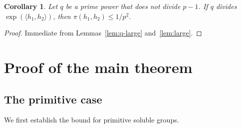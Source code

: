 \documentclass[10pt,a4paper]{amsart}
\newtheorem{corollary}{Corollary}
\begin{document}
\begin{corollary}\label{cor:q-large}
	Let $q$ be a prime power that does not divide $p-1$. If $q$ 
	divides $\exp(\langle h_1, h_2 \rangle)$, then 
	$\pi(h_1,h_2) \leq 1/p^2$.
\end{corollary}
\begin{proof}
	Immediate from Lemmas~\ref{lem:q-large} and~\ref{lem:large}.
	\end{proof}


	\section{Proof of the main theorem}
	
	\subsection{The primitive case}
	
	We first establish the bound for primitive soluble groups.
	
\end{document}
